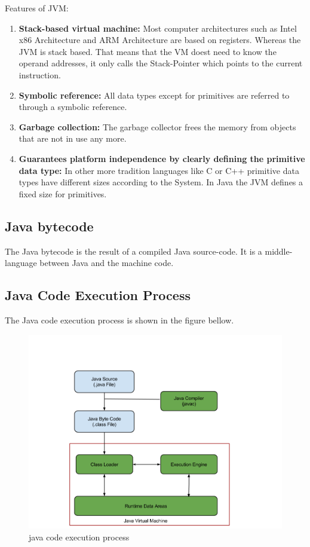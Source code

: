 Features of JVM:
\begin{enumerate}
\item \textbf{Stack-based virtual machine:} Most computer architectures such as Intel x86 Architecture and ARM Architecture are based on registers. Whereas the JVM is stack based.\cite{javaJVM} That means that the VM doest need to know the operand addresses, it only calls the Stack-Pointer which points to the current instruction. \cite{stackBased_vs_registerBased} 
\item \textbf{Symbolic reference:} All data types except for primitives are referred to through a symbolic reference.   
\item \textbf{Garbage collection:} The garbage collector frees the memory from objects that are not in use any more. \cite{javaGarbageCollector}  
\item \textbf{Guarantees platform independence by clearly defining the primitive data type:} In other more tradition languages like C or C++ primitive data types have different sizes according to the System. In Java the JVM defines a fixed size for primitives. 
\end{enumerate} \cite{javaJVM}

\subsection{Java bytecode}
The Java bytecode is the result of a compiled Java source-code. It is a middle-language between Java and the machine code. \cite{javaJVM}  

\subsection{Java Code Execution Process} 
The Java code execution process is shown in the figure bellow. 
\begin{figure}[H]
\centering
\includegraphics[width=1.0\linewidth]{graphics/java-code-execution-process.png}
\caption{java code execution process}
\end{figure}
